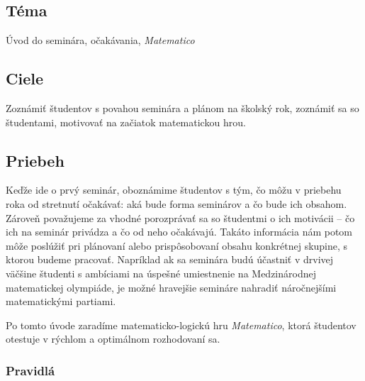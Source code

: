 

\subsection*{Téma}
Úvod do seminára, očakávania, \textit{Matematico}

\subsection*{Ciele}
Zoznámiť študentov s povahou seminára a plánom na školský rok, zoznámiť sa so študentami, motivovať na začiatok matematickou hrou.

\subsection*{Priebeh}

Keďže ide o prvý seminár, oboznámime študentov s tým, čo môžu v priebehu roka od stretnutí očakávať: aká bude forma seminárov a čo bude ich obsahom. Zároveň považujeme za vhodné porozprávať sa so študentmi o ich motivácii -- čo ich na seminár privádza a čo od neho očakávajú. Takáto informácia nám potom môže poslúžiť pri plánovaní alebo prispôsobovaní obsahu konkrétnej skupine, s ktorou budeme pracovať. Napríklad ak sa seminára budú účastniť v drvivej väčšine študenti s ambíciami na úspešné umiestnenie na Medzinárodnej matematickej olympiáde, je možné hravejšie semináre nahradiť náročnejšími matematickými partiami.

Po tomto úvode zaradíme matematicko-logickú hru \textit{Matematico}, ktorá študentov otestuje v rýchlom a optimálnom rozhodovaní sa.

\subsubsection*{Pravidlá}

